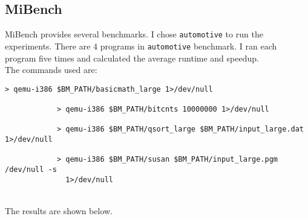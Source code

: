 \documentclass[12pt]{article}
\begin{document}
    \subsection{MiBench}
        MiBench provides several benchmarks. I chose \verb|automotive| to run the experiments.
        There are $4$ programs in \verb|automotive| benchmark.
        I ran each program five times and calculated the average runtime and speedup.
        ~\\
        The commands used are:
        \begin{lstlisting}[style=Shell]
            > qemu-i386 $BM_PATH/basicmath_large 1>/dev/null
            
            > qemu-i386 $BM_PATH/bitcnts 10000000 1>/dev/null
            
            > qemu-i386 $BM_PATH/qsort_large $BM_PATH/input_large.dat 1>/dev/null
            
            > qemu-i386 $BM_PATH/susan $BM_PATH/input_large.pgm /dev/null -s
              1>/dev/null
        \end{lstlisting}
        ~\\
        The results are shown below.
\end{document}

